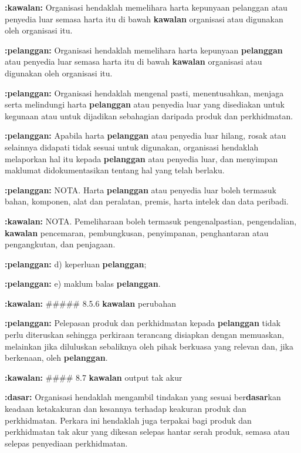 \documentclass{article}
\begin{document}
\textbf{:kawalan:} Organisasi hendaklah memelihara harta kepunyaan pelanggan atau penyedia luar semasa
harta itu di bawah \textbf{kawalan} organisasi atau digunakan oleh organisasi itu.

\textbf{:pelanggan:} Organisasi hendaklah memelihara harta kepunyaan \textbf{pelanggan} atau penyedia luar semasa
harta itu di bawah \textbf{kawalan} organisasi atau digunakan oleh organisasi itu.

\textbf{:pelanggan:} Organisasi hendaklah mengenal pasti, menentusahkan, menjaga serta melindungi harta
\textbf{pelanggan} atau penyedia luar yang disediakan untuk kegunaan atau untuk dijadikan
sebahagian daripada produk dan perkhidmatan.

\textbf{:pelanggan:} Apabila harta \textbf{pelanggan} atau penyedia luar hilang, rosak atau selainnya didapati tidak sesuai
untuk digunakan, organisasi hendaklah melaporkan hal itu kepada \textbf{pelanggan} atau penyedia
luar, dan menyimpan maklumat didokumentasikan tentang hal yang telah berlaku.

\textbf{:pelanggan:} NOTA. Harta \textbf{pelanggan} atau penyedia luar boleh termasuk bahan, komponen, alat dan peralatan,
premis, harta intelek dan data peribadi.

\textbf{:kawalan:} NOTA. Pemeliharaan boleh termasuk pengenalpastian, pengendalian, \textbf{kawalan} pencemaran,
pembungkusan, penyimpanan, penghantaran atau pengangkutan, dan penjagaan.

\textbf{:pelanggan:} d) keperluan \textbf{pelanggan};

\textbf{:pelanggan:} e) maklum balas \textbf{pelanggan}.

\textbf{:kawalan:} \#\#\#\#\# 8.5.6 \textbf{kawalan} perubahan

\textbf{:pelanggan:} Pelepasan produk dan perkhidmatan kepada \textbf{pelanggan} tidak perlu diteruskan sehingga
perkiraan terancang disiapkan dengan memuaskan, melainkan jika diluluskan sebaliknya oleh
pihak berkuasa yang relevan dan, jika berkenaan, oleh \textbf{pelanggan}.

\textbf{:kawalan:} \#\#\#\# 8.7 \textbf{kawalan} output tak akur

\textbf{:dasar:} Organisasi hendaklah mengambil tindakan yang sesuai ber\textbf{dasar}kan keadaan ketakakuran
dan kesannya terhadap keakuran produk dan perkhidmatan. Perkara ini hendaklah juga
terpakai bagi produk dan perkhidmatan tak akur yang dikesan selepas hantar serah produk,
semasa atau selepas penyediaan perkhidmatan.
\end{document}
